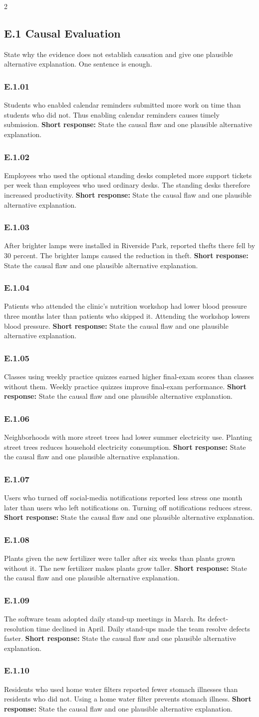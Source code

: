 \documentclass[10pt]{extarticle}
\newcommand{\bankitem}[1]{\subsubsection*{#1}}
\begin{document}
\begin{multicols}{2}
\subsection*{E.1 Causal Evaluation}
State why the evidence does not establish causation and give one plausible
alternative explanation. One sentence is enough.
\bankitem{E.1.01}
Students who enabled calendar reminders submitted more work on time than students who did not. Thus enabling calendar reminders causes timely submission.
\textbf{Short response:} State the causal flaw and one plausible alternative explanation.
\bankitem{E.1.02}
Employees who used the optional standing desks completed more support tickets per week than employees who used ordinary desks. The standing desks therefore increased productivity.
\textbf{Short response:} State the causal flaw and one plausible alternative explanation.
\bankitem{E.1.03}
After brighter lamps were installed in Riverside Park, reported thefts there fell by 30 percent. The brighter lamps caused the reduction in theft.
\textbf{Short response:} State the causal flaw and one plausible alternative explanation.
\bankitem{E.1.04}
Patients who attended the clinic's nutrition workshop had lower blood pressure three months later than patients who skipped it. Attending the workshop lowers blood pressure.
\textbf{Short response:} State the causal flaw and one plausible alternative explanation.
\bankitem{E.1.05}
Classes using weekly practice quizzes earned higher final-exam scores than classes without them. Weekly practice quizzes improve final-exam performance.
\textbf{Short response:} State the causal flaw and one plausible alternative explanation.
\bankitem{E.1.06}
Neighborhoods with more street trees had lower summer electricity use. Planting street trees reduces household electricity consumption.
\textbf{Short response:} State the causal flaw and one plausible alternative explanation.
\bankitem{E.1.07}
Users who turned off social-media notifications reported less stress one month later than users who left notifications on. Turning off notifications reduces stress.
\textbf{Short response:} State the causal flaw and one plausible alternative explanation.
\bankitem{E.1.08}
Plants given the new fertilizer were taller after six weeks than plants grown without it. The new fertilizer makes plants grow taller.
\textbf{Short response:} State the causal flaw and one plausible alternative explanation.
\bankitem{E.1.09}
The software team adopted daily stand-up meetings in March. Its defect-resolution time declined in April. Daily stand-ups made the team resolve defects faster.
\textbf{Short response:} State the causal flaw and one plausible alternative explanation.
\bankitem{E.1.10}
Residents who used home water filters reported fewer stomach illnesses than residents who did not. Using a home water filter prevents stomach illness.
\textbf{Short response:} State the causal flaw and one plausible alternative explanation.

\end{multicols}
\end{document}
